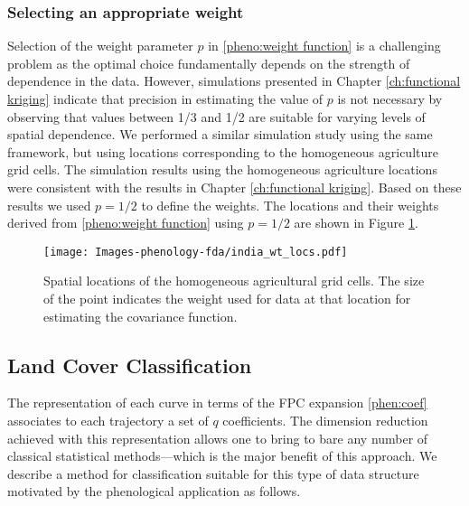 \subsubsection{Selecting an appropriate weight} 

\label{sub:selecting_an_appropriate_weight} 
Selection of the weight parameter $p$ in \eqref{pheno:weight function} is a challenging problem as the optimal choice fundamentally depends on the strength of dependence in the data. However, simulations presented in Chapter \ref{ch:functional kriging} indicate that precision in estimating the value of $p$ is not necessary by observing that values between 1/3 and 1/2 are suitable for varying levels of spatial dependence. We performed a similar simulation study using the same framework, but using locations corresponding to the homogeneous agriculture grid cells. The simulation results using the homogeneous agriculture locations were consistent with the results in Chapter \ref{ch:functional kriging}. Based on these results we used $p=1/2$ to define the weights. The locations and their weights derived from \eqref{pheno:weight function} using $p=1/2$ are shown in Figure \ref{fig:india weighted locs}. 
\begin{figure}
	[h] \centering 
	\texttt{[image: Images-phenology-fda/india\_wt\_locs.pdf]} \caption{Spatial locations of the homogeneous agricultural grid cells. The size of the point indicates the weight used for data at that location for estimating the covariance function. } \label{fig:india weighted locs} 
\end{figure}


\subsection{Land Cover Classification} 
\label{sub:land_cover_classification}

The representation of each curve in terms of the FPC expansion \eqref{phen:coef} associates to each trajectory a set of $q$ coefficients. The dimension reduction achieved with this representation allows one to bring to bare any number of classical statistical methods---which is the major benefit of this approach. We describe a method for classification suitable for this type of data structure motivated by the phenological application as follows.


